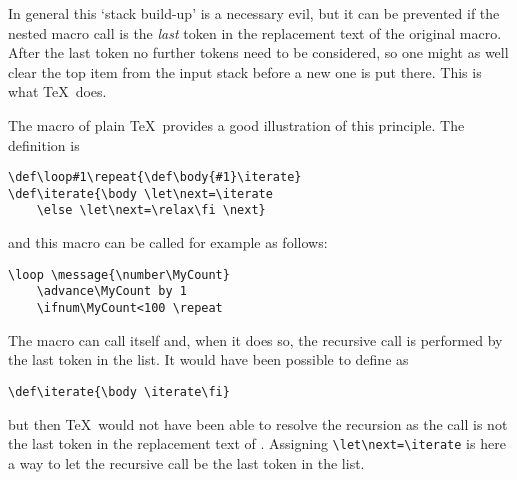 In general this `stack build-up' is a necessary evil, but
it can be prevented if the nested macro call is the
{\em last\/} token in the replacement text of the original
macro. After the last token no further tokens need to be
considered, so one might as well clear the top item
from the input stack
before a new one is put there.
This is what \TeX\ does.

The  macro of plain \TeX\ provides a good illustration
\label{loop:ex}
of this principle. The definition is
\begin{verbatim}
\def\loop#1\repeat{\def\body{#1}\iterate}
\def\iterate{\body \let\next=\iterate
    \else \let\next=\relax\fi \next}
\end{verbatim}
and this macro can be called for example as follows:
\begin{verbatim}
\loop \message{\number\MyCount}
    \advance\MyCount by 1
    \ifnum\MyCount<100 \repeat
\end{verbatim}
The macro  can call itself and, when it does so,
the recursive call is performed by the last token in the list.
It would have been possible to define 
as
\begin{verbatim}
\def\iterate{\body \iterate\fi}
\end{verbatim}
but then \TeX\ would not have been able to resolve the recursion
as the call  is not the last token in the replacement
text of . Assigning \verb>\let\next=\iterate>
is here a way to let
the recursive call be the last token in the list.

